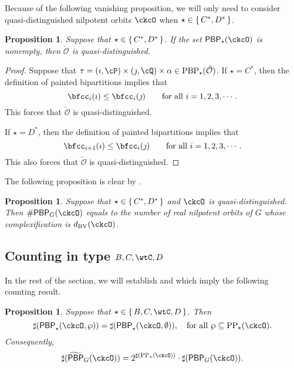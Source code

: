 \documentclass[12pt,a4paper]{amsart}
\def\subset{\subseteq}
\newcommand{\CO}{{\mathcal {O}}}
\numberwithin{equation}{section}
\newtheorem{prop}[thm]{Proposition}
\theoremstyle{remark}
\def\dBV{d_{\mathrm{BV}}}
\def\CPPs{\mathrm{PP}_{\star}}
\def\tPBP{\widetilde{\mathsf{PBP}}}
\def\PBP{\mathsf{PBP}}
\def\tPBP{\widetilde{\mathsf{PBP}}}
\def\PBPop#1#2#3#4{\PBP_{#1}^{#2}(#3,#4)}
\newcommand{\PBPOP}[1][]{\PBPop{\star}{#1}{\ckcO}{\wp}}
\begin{document}
Because of the following vanishing proposition, we will only need to consider
quasi-distinguished nilpotent orbits $\ckcO$ when $\star\in \set{C^*, D^*}$.

\begin{prop}\label{prop:CD*}
  Suppose that $\star\in \set{C^*, D^*}$. If the set $\PBP_\star(\ckcO)$ is nonempty, then $\check \CO$ is quasi-distinguished.
\end{prop}
\begin{proof}
  Suppose that $\tau=(\imath,\cP)\times(\jmath,\cQ)\times \alpha \in  \mathrm{PBP}_\star(\check \CO)$. If  $\star=C^*$, then  the definition of painted bipartitions implies that
 \[
 \bfcc_i(\imath)\leq \bfcc_i(\jmath) \qquad \textrm{for all } i=1,2,3, \cdots.
 \]
This forces that $\check \CO$ is quasi-distinguished.

 If  $\star=D^*$, then  the definition of painted bipartitions implies that
 \[
 \bfcc_{i+1}(\imath)\leq \bfcc_i(\jmath) \qquad \textrm{for all } i=1,2,3, \cdots.
 \]
This  also forces that   $\check \CO$ is quasi-distinguished.
 \end{proof}

The following proposition is clear by .
\begin{prop}\label{prop:count.CD*}
  Suppose that $\star\in \set{C^*, D^*}$ and $\ckcO$ is quasi-distinguished.
  Then $\# \PBP_{G}(\ckcO)$ equals to the number of real nilpotent orbits of $G$
  whose complexification is $\dBV(\ckcO)$.
\end{prop}

\subsection{Counting in type $B,C,\wtC,D$}


In the rest of the section, we will establish  and  which
imply the following counting result.

\begin{prop} \label{prop:PBP2} Suppose that   $\star\in \set{B,C,\wtC,D}$. Then
  \[
    \sharp(\PBPOP) = \sharp(\PBPop{\star}{}{\ckcO}{\emptyset}), \quad \textrm{for all } \wp \subset \CPPs(\ckcO).
  \]
 Consequently,
     \[
     \sharp(\tPBP_{G}(\ckcO)) = 2^{\sharp(\CPPs(\ckcO))}\cdot \sharp(\PBP_{G}(\ckcO)).
  \]
\end{prop}
\end{document}
